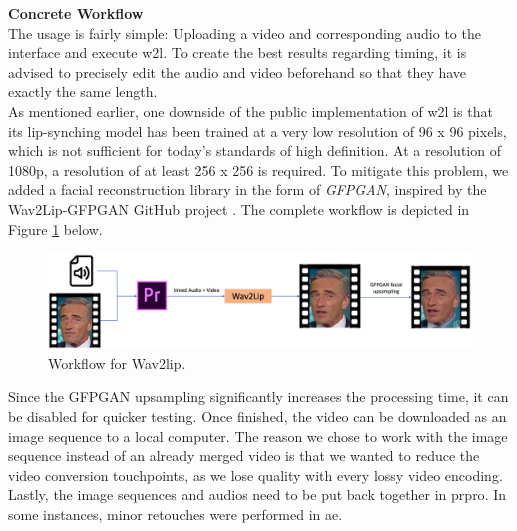 \documentclass[
  a4paper,  %
  twoside,  %
  bibliography=totoc,
  headsepline,
  cleardoublepage=empty,
  parskip=half,
  draft=false
]{scrbook}
\begin{document}
\textbf{Concrete Workflow} \\
The usage is fairly simple: Uploading a video and corresponding audio to the interface and execute \gls{w2l}. To create the best results regarding timing, it is advised to precisely edit the audio and video beforehand so that they have exactly the same length. \\
As mentioned earlier, one downside of the public implementation of \gls{w2l} is that its lip-synching model has been trained at a very low resolution of 96 x 96 pixels, which is not sufficient for today's standards of high definition. At a resolution of 1080p, a resolution of at least 256 x 256 is required. To mitigate this problem, we added a facial reconstruction library in the form of \textit{GFPGAN}, inspired by the Wav2Lip-GFPGAN GitHub project \cite{sainyAjaysainyWav2LipGFPGAN2023}.
The complete workflow is depicted in Figure \ref{fig:w2l workflow} below.

\begin{figure}[h]
  \centering
  \includegraphics[width=1\textwidth]{./graphics/wav2lip/w2l workflow.png}
  \caption{Workflow for Wav2lip.}
  \label{fig:w2l workflow}
\end{figure}

Since the GFPGAN upsampling significantly increases the processing time, it can be disabled for quicker testing. Once finished, the video can be downloaded as an image sequence to a local computer. The reason we chose to work with the image sequence instead of an already merged video is that we wanted to reduce the video conversion touchpoints, as we lose quality with every lossy video encoding. Lastly, the image sequences and audios need to be put back together in \gls{prpro}. In some instances, minor retouches were performed in \gls{ae}.
\end{document}

